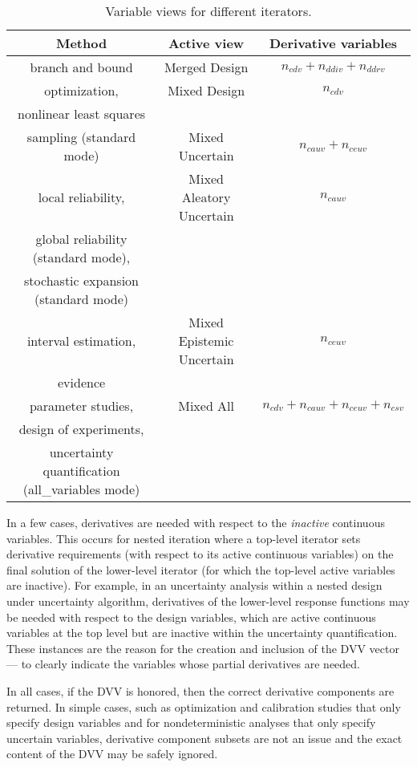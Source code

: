 \begin{table}
\centering
\caption{Variable views for different iterators.}
\label{responses:active_tab}\vspace{2mm}
\begin{tabular}{|c|c|c|}
\hline
\textbf{Method} & \textbf{Active view} & \textbf{Derivative variables} \\
\hline
branch and bound         & Merged Design   & $n_{cdv}+n_{ddiv}+n_{ddrv}$ \\
\hline
optimization,            & Mixed Design    & $n_{cdv}$ \\
nonlinear least squares  &                 &           \\
\hline
sampling (standard mode) & Mixed Uncertain & $n_{cauv}+n_{ceuv}$ \\
\hline
local reliability,       & Mixed Aleatory Uncertain & $n_{cauv}$ \\
global reliability (standard mode),  &              &            \\
stochastic expansion (standard mode) &              &            \\
\hline
interval estimation,     & Mixed Epistemic Uncertain & $n_{ceuv}$ \\
evidence                 &                           &            \\
\hline
parameter studies,       & Mixed All & $n_{cdv}+n_{cauv}+n_{ceuv}+n_{csv}$\\
design of experiments,   &           & \\
uncertainty quantification (all\_variables mode) & & \\
\hline
\end{tabular}
\end{table}

In a few cases, derivatives are needed with respect to the
\emph{inactive} continuous variables.  This occurs for nested
iteration where a top-level iterator sets derivative requirements
(with respect to its active continuous variables) on the final
solution of the lower-level iterator (for which the top-level active
variables are inactive).  For example, in an uncertainty analysis
within a nested design under uncertainty algorithm, derivatives of the
lower-level response functions may be needed with respect to the
design variables, which are active continuous variables at the top
level but are inactive within the uncertainty quantification.  These
instances are the reason for the creation and inclusion of the DVV
vector --- to clearly indicate the variables whose partial derivatives
are needed.

In all cases, if the DVV is honored, then the correct derivative
components are returned.  In simple cases, such as optimization and
calibration studies that only specify design variables and for
nondeterministic analyses that only specify uncertain variables,
derivative component subsets are not an issue and the exact content of
the DVV may be safely ignored.
